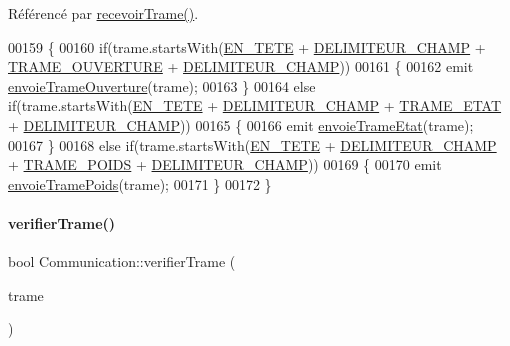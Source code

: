 Référencé par \hyperlink{_communication_8cpp_source_l00119}{recevoir\+Trame()}.


\begin{DoxyCode}
00159 \{
00160     \textcolor{keywordflow}{if}(trame.startsWith(\hyperlink{_communication_8h_add7c72d962d885317215f93ae8a9dc28}{EN\_TETE} + \hyperlink{_communication_8h_ac3d2c8b3b9dbc07cedf0bfa8a75d268f}{DELIMITEUR\_CHAMP} + 
      \hyperlink{_communication_8h_ad49128d4b2d459f0d7f057b2e59fb2d5}{TRAME\_OUVERTURE} + \hyperlink{_communication_8h_ac3d2c8b3b9dbc07cedf0bfa8a75d268f}{DELIMITEUR\_CHAMP}))
00161     \{
00162         emit \hyperlink{class_communication_a9fb098f5b5cb8931efefc58984529119}{envoieTrameOuverture}(trame);
00163     \}
00164     \textcolor{keywordflow}{else} \textcolor{keywordflow}{if}(trame.startsWith(\hyperlink{_communication_8h_add7c72d962d885317215f93ae8a9dc28}{EN\_TETE} + \hyperlink{_communication_8h_ac3d2c8b3b9dbc07cedf0bfa8a75d268f}{DELIMITEUR\_CHAMP} + 
      \hyperlink{_communication_8h_a57c2e74056a9338d26f264703e2158d8}{TRAME\_ETAT} + \hyperlink{_communication_8h_ac3d2c8b3b9dbc07cedf0bfa8a75d268f}{DELIMITEUR\_CHAMP}))
00165     \{
00166         emit \hyperlink{class_communication_a8beb7417ede75d0056b06788ef72d21b}{envoieTrameEtat}(trame);
00167     \}
00168     \textcolor{keywordflow}{else} \textcolor{keywordflow}{if}(trame.startsWith(\hyperlink{_communication_8h_add7c72d962d885317215f93ae8a9dc28}{EN\_TETE} + \hyperlink{_communication_8h_ac3d2c8b3b9dbc07cedf0bfa8a75d268f}{DELIMITEUR\_CHAMP} + 
      \hyperlink{_communication_8h_a3a24fc54a5e48cb3eb9786ce61933a6c}{TRAME\_POIDS} + \hyperlink{_communication_8h_ac3d2c8b3b9dbc07cedf0bfa8a75d268f}{DELIMITEUR\_CHAMP}))
00169     \{
00170         emit \hyperlink{class_communication_aaea5653e8aa1b50b4774caf65db21409}{envoieTramePoids}(trame);
00171     \}
00172 \}
\end{DoxyCode}
\mbox{\label{class_communication_a3958c8f275ff8d50dca85afe65c795d1}} 
\paragraph{\texorpdfstring{verifier\+Trame()}{verifierTrame()}}
{\footnotesize\ttfamily bool Communication\+::verifier\+Trame (\begin{DoxyParamCaption}\item[{Q\+String}]{trame }\end{DoxyParamCaption})\hspace{0.3cm}{\ttfamily [private]}}



